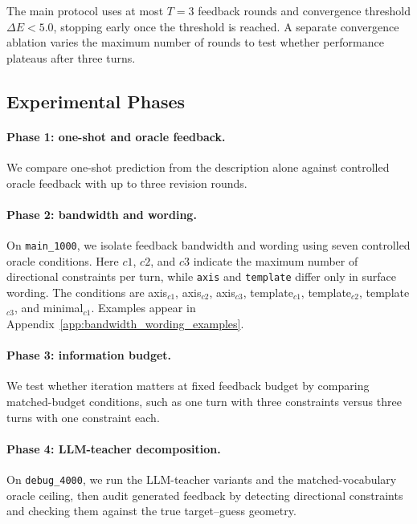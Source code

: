\documentclass[11pt]{article}
\begin{document}
The main protocol uses at most $T=3$ feedback rounds and convergence
threshold $\Delta E < 5.0$, stopping early once the threshold is reached. A
separate convergence ablation varies the maximum number of rounds to test
whether performance plateaus after three turns.

\subsection{Experimental Phases}
\label{sec:experiment_phases}


\paragraph{Phase 1: one-shot and oracle feedback.}
We compare one-shot prediction from the description alone against controlled
oracle feedback with up to three revision rounds.

\paragraph{Phase 2: bandwidth and wording.}
On \texttt{main\_1000}, we isolate feedback bandwidth and wording using
seven controlled oracle conditions. Here $c1$, $c2$, and $c3$ indicate the
maximum number of directional constraints per turn, while \texttt{axis} and
\texttt{template} differ only in surface wording. The conditions are
axis$_{c1}$, axis$_{c2}$, axis$_{c3}$, template$_{c1}$, template$_{c2}$,
template$_{c3}$, and minimal$_{c1}$. Examples appear in
Appendix~\ref{app:bandwidth_wording_examples}.

\paragraph{Phase 3: information budget.}
We test whether iteration matters at fixed feedback budget by comparing
matched-budget conditions, such as one turn with three constraints versus
three turns with one constraint each.

\paragraph{Phase 4: LLM-teacher decomposition.}
On \texttt{debug\_4000}, we run the LLM-teacher variants and the
matched-vocabulary oracle ceiling, then audit generated feedback by detecting
directional constraints and checking them against the true target--guess
geometry.
\end{document}
